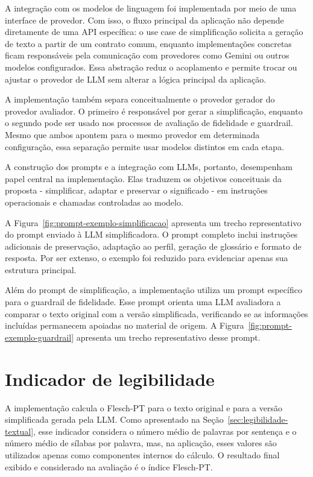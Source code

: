 A integração com os modelos de linguagem foi implementada por meio de uma interface de provedor. Com isso, o fluxo principal da aplicação não depende diretamente de uma API específica: o use case de simplificação solicita a geração de texto a partir de um contrato comum, enquanto implementações concretas ficam responsáveis pela comunicação com provedores como Gemini ou outros modelos configurados. Essa abstração reduz o acoplamento e permite trocar ou ajustar o provedor de LLM sem alterar a lógica principal da aplicação.

A implementação também separa conceitualmente o provedor gerador do provedor avaliador. O primeiro é responsável por gerar a simplificação, enquanto o segundo pode ser usado nos processos de avaliação de fidelidade e guardrail. Mesmo que ambos apontem para o mesmo provedor em determinada configuração, essa separação permite usar modelos distintos em cada etapa.

A construção dos prompts e a integração com LLMs, portanto, desempenham papel central na implementação. Elas traduzem os objetivos conceituais da proposta - simplificar, adaptar e preservar o significado - em instruções operacionais e chamadas controladas ao modelo.

A Figura~\ref{fig:prompt-exemplo-simplificacao} apresenta um trecho representativo do prompt enviado à LLM simplificadora. O prompt completo inclui instruções adicionais de preservação, adaptação ao perfil, geração de glossário e formato de resposta. Por ser extenso, o exemplo foi reduzido para evidenciar apenas sua estrutura principal.



Além do prompt de simplificação, a implementação utiliza um prompt específico para o guardrail de fidelidade. Esse prompt orienta uma LLM avaliadora a comparar o texto original com a versão simplificada, verificando se as informações incluídas permanecem apoiadas no material de origem. A Figura~\ref{fig:prompt-exemplo-guardrail} apresenta um trecho representativo desse prompt.



\section{Indicador de legibilidade}
\label{sec:indicador-legibilidade}

A implementação calcula o Flesch-PT para o texto original e para a versão simplificada gerada pela LLM. Como apresentado na Seção~\ref{sec:legibilidade-textual}, esse indicador considera o número médio de palavras por sentença e o número médio de sílabas por palavra, mas, na aplicação, esses valores são utilizados apenas como componentes internos do cálculo. O resultado final exibido e considerado na avaliação é o índice Flesch-PT.

